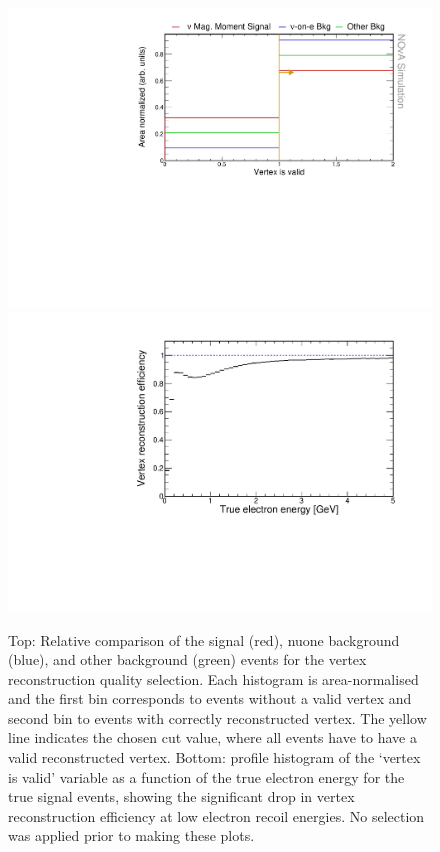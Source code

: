 \begin{figure}[hbtp]
\centering
\includegraphics[width=.9\textwidth]{Plots/NuMMEventSelection/N1Cut_vtxIsValid.pdf}
\includegraphics[width=.9\textwidth]{Plots/NuMMEventSelection/VtxIsValidNuMM.pdf}
\caption[Vertex reconstruction quality cut]{Top: Relative comparison of the signal (red), \acrshort{nuone} background (blue), and other background (green) events for the vertex reconstruction quality selection. Each histogram is area-normalised and the first bin corresponds to events without a valid vertex and second bin to events with correctly reconstructed vertex. The yellow line indicates the chosen cut value, where all events have to have a valid reconstructed vertex. Bottom: profile histogram of the `vertex is valid' variable as a function of the true electron energy for the true signal events, showing the significant drop in vertex reconstruction efficiency at low electron recoil energies. No selection was applied prior to making these plots.}
\label{fig:NuMMCutsVertexIsValid}
\end{figure}

